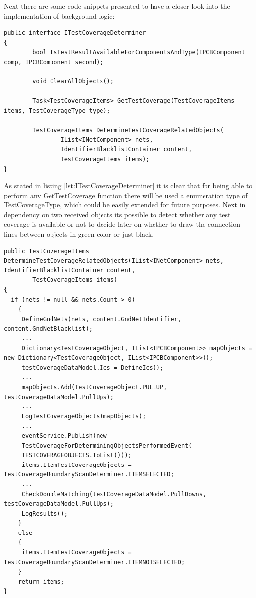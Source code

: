 Next there are some code snippets presented to have a closer look into the implementation of background logic:
\begin{lstlisting}[language={[Sharp]C},caption={ITestCoverageDeterminer},captionpos=b,label=lst:ITestCoverageDeterminer]
public interface ITestCoverageDeterminer
{
		bool IsTestResultAvailableForComponentsAndType(IPCBComponent comp, IPCBComponent second);

		void ClearAllObjects();

		Task<TestCoverageItems> GetTestCoverage(TestCoverageItems items, TestCoverageType type);

		TestCoverageItems DetermineTestCoverageRelatedObjects(
				IList<INetComponent> nets,
				IdentifierBlacklistContainer content,
				TestCoverageItems items);
}
\end{lstlisting}

As stated in listing \ref{lst:ITestCoverageDeterminer} it is clear that for being able to perform any GetTestCoverage function there will be used a enumeration type of TestCoverageType, which could be easily extended for future purposes. Next in dependency on two received objects its possible to detect whether any test coverage is available or not to decide later on whether to draw the connection lines between objects in green color or just black.

\begin{lstlisting}[language={[Sharp]C},caption={DetermineTestCoverageRelatedObjects},captionpos=b,label=lst:DetermineTestCoverageRelatedObjects]
public TestCoverageItems DetermineTestCoverageRelatedObjects(IList<INetComponent> nets, IdentifierBlacklistContainer content,
		TestCoverageItems items)
{
  if (nets != null && nets.Count > 0)
	{
	 DefineGndNets(nets, content.GndNetIdentifier, content.GndNetBlacklist);
	 ...
	 Dictionary<TestCoverageObject, IList<IPCBComponent>> mapObjects = new Dictionary<TestCoverageObject, IList<IPCBComponent>>();
	 testCoverageDataModel.Ics = DefineIcs();
	 ...
	 mapObjects.Add(TestCoverageObject.PULLUP, testCoverageDataModel.PullUps);
	 ...
	 LogTestCoverageObjects(mapObjects);
	 ...
	 eventService.Publish(new 
	 TestCoverageForDeterminingObjectsPerformedEvent(
	 TESTCOVERAGEOBJECTS.ToList()));
	 items.ItemTestCoverageObjects = TestCoverageBoundaryScanDeterminer.ITEMSELECTED;
	 ...
	 CheckDoubleMatching(testCoverageDataModel.PullDowns, testCoverageDataModel.PullUps);
	 LogResults();
	}
	else
	{
	 items.ItemTestCoverageObjects = TestCoverageBoundaryScanDeterminer.ITEMNOTSELECTED;
	}
	return items;
}
\end{lstlisting}

